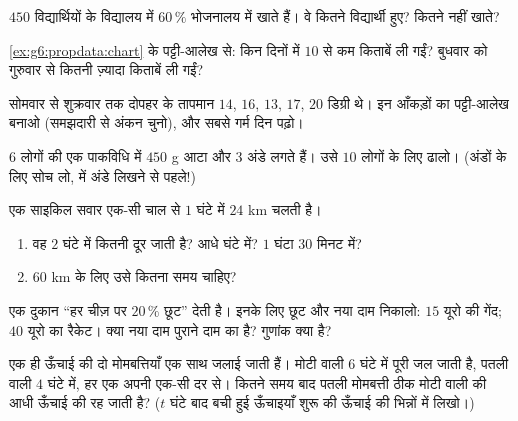 \begin{exercise}[$\star$]\label{exo:g6:propdata:6}
$450$ विद्यार्थियों के विद्यालय में $60\,\%$ भोजनालय में खाते
हैं। वे कितने विद्यार्थी हुए? कितने नहीं खाते?
\end{exercise}

\begin{exercise}[$\star$]\label{exo:g6:propdata:7}
\cref{ex:g6:propdata:chart} के पट्टी-आलेख से: किन दिनों में
$10$ से कम किताबें ली गईं? बुधवार को गुरुवार से कितनी ज़्यादा
किताबें ली गईं?
\end{exercise}

\begin{exercise}[$\star$]\label{exo:g6:propdata:8}
सोमवार से शुक्रवार तक दोपहर के तापमान $14$, $16$, $13$,
$17$, $20$ डिग्री थे। इन आँकड़ों का पट्टी-आलेख बनाओ (समझदारी से
अंकन चुनो), और सबसे गर्म दिन पढ़ो।
\end{exercise}

\begin{exercise}[$\star\star$]\label{exo:g6:propdata:9}
$6$ लोगों की एक पाकविधि में $450$ g आटा और $3$ अंडे लगते हैं।
उसे $10$ लोगों के लिए ढालो। (अंडों के लिए सोच लो, 
में अंडे लिखने से पहले!)
\end{exercise}

\begin{exercise}[$\star\star$]\label{exo:g6:propdata:10}
एक साइकिल सवार एक-सी चाल से $1$ घंटे में $24$ km चलती है।
\begin{enumerate}
  \item वह $2$ घंटे में कितनी दूर जाती है? आधे घंटे में?
        $1$ घंटा $30$ मिनट में?
  \item $60$ km के लिए उसे कितना समय चाहिए?
\end{enumerate}
\end{exercise}

\begin{exercise}[$\star\star$]\label{exo:g6:propdata:11}
एक दुकान ``हर चीज़ पर $20\,\%$ छूट'' देती है। इनके लिए छूट और नया
दाम निकालो: $15$ यूरो की गेंद; $40$ यूरो का रैकेट। क्या नया दाम
पुराने दाम का  है? गुणांक क्या है?
\end{exercise}

\begin{exercise}[$\star\star\star$]\label{exo:g6:propdata:12}
एक ही ऊँचाई की दो मोमबत्तियाँ एक साथ जलाई जाती हैं। मोटी वाली
$6$ घंटे में पूरी जल जाती है, पतली वाली $4$ घंटे में, हर एक अपनी
एक-सी दर से। कितने समय बाद पतली मोमबत्ती ठीक मोटी वाली की आधी
ऊँचाई की रह जाती है? ($t$ घंटे बाद बची हुई ऊँचाइयाँ शुरू की
ऊँचाई की भिन्नों में लिखो।)
\end{exercise}

